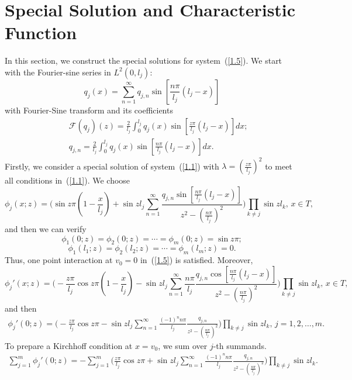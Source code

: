 \documentclass[10pt,a4paper]{article}
\theoremstyle{plain}
\theoremstyle{definition}
\theoremstyle{remark}
\numberwithin{equation}{section}
\begin{document}
\section{Special Solution and Characteristic Function}
In this section, we construct the special solutions for system~(\ref{1.5}).
We start with the Fourier-sine series in $L^{2}(0,l_{j})$:
$$q_{j}(x)=\sum_{n=1}^{\infty}q_{j,n}\sin[\frac{n\pi}{l_{j}} (l_{j}-x)]$$ with Fourier-Sine transform and its coefficients
\begin{eqnarray}\label{2.1}
&&\mathcal{F}(q_{j})(z)=\frac{2}{l_{j}}\int_{0}^{l_{j}}q_{j}(x)\sin[\frac{z\pi}{l_{j}} (l_{j}-x)]dx;\\
&&q_{j,n}=\frac{2}{l_{j}}\int_{0}^{l_{j}}q_{j}(x)\sin[\frac{n\pi}{l_{j}} (l_{j}-x)]dx.
\end{eqnarray}
Firstly, we consider a special solution of system~(\ref{1.1}) with $\lambda=(\frac{z\pi}{l_{j}})^{2}$ to meet all conditions in~(\ref{1.1}). We choose
\begin{equation} \label{2.2}
\phi_{j}(x;z)=\Big(\sin{z\pi(1-\frac{x}{l_{j}})}+\sin{z l_{j}}\sum_{n=1}^{\infty}\frac{q_{j,n}\sin[\frac{n\pi}{l_{j}}(l_{j}-x)]}{z^{2}-(\frac{n\pi}{l_{j}})^{2}}\Big)\prod_{k\neq j}\sin{z l_{k}},\,x\in T,
\end{equation} and then we can verify
\begin{equation}
\phi_{1}(0;z)=\phi_{2}(0;z)=\cdots=\phi_{m}(0;z)=\sin z\pi;
\end{equation}
\begin{equation}
\phi_{1}(l_{1};z)=\phi_{2}(l_{2};z)=\cdots=\phi_{m}(l_{m};z)=0.
\end{equation}
Thus, one point interaction at $v_{0}=0$ in~(\ref{1.5}) is satisfied.
Moreover,
\begin{equation}\label{3333}
\phi_{j}'(x;z)=\Big(-\frac{z\pi}{l_{j}}\cos{z\pi(1-\frac{x}{l_{j}})}-\sin{z l_{j}}\sum_{n=1}^{\infty}\frac{n\pi}{l_{j}}\frac{q_{j,n}\cos[\frac{n\pi}{l_{j}}(l_{j}-x)]}{z^{2}-(\frac{n\pi}{l_{j}})^{2}}\Big)\prod_{k\neq j}\sin{z l_{k}},\,x\in T,
\end{equation} 
and then
\begin{eqnarray}\label{2.3}
\phi_{j}'(0;z)=\Big(-\frac{z\pi}{l_{j}}\cos{z\pi}-\sin{z l_{j}}\sum_{n=1}^{\infty}\frac{(-1)^{n}n\pi}{l_{j}}\frac{q_{j,n}}{z^{2}-(\frac{n\pi}{l_{j}})^{2}}\Big)\prod_{k\neq j}\sin{z l_{k}},\,j=1,2,\ldots,m.
\end{eqnarray}
To prepare a Kirchhoff condition at $x=v_{0}$, we sum over $j$-th summands.
\begin{eqnarray}
\sum_{j=1}^{m}\phi_{j}'(0;z)=-\sum_{j=1}^{m}\Big(\frac{z\pi}{l_{j}}\cos{z\pi}+\sin{z l_{j}}\sum_{n=1}^{\infty}\frac{(-1)^{n}n\pi}{l_{j}}\frac{q_{j,n}}{z^{2}-(\frac{n\pi}{l_{j}})^{2}}\Big)\prod_{k\neq j}\sin{z l_{k}}.\label{25}
\end{eqnarray}
\end{document}
